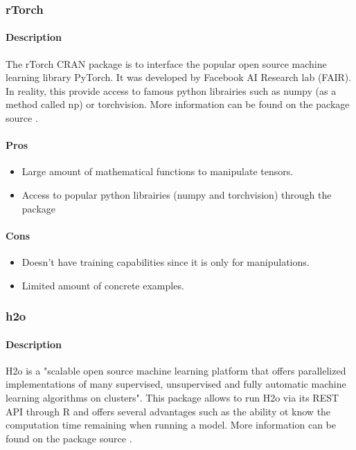 \documentclass[letter,8pt]{article}\usepackage[]{graphicx}\usepackage[]{color}
\begin{document}
\subsubsection{rTorch}
\paragraph{Description}
The rTorch CRAN package is to interface the popular open source machine learning library PyTorch. It was developed by Facebook AI Research lab (FAIR). In reality, this provide access to famous python librairies such as numpy (as a method called np) or torchvision. More information can be found on the package source \cite{rTorch2019}.
\paragraph{Pros}
\begin{itemize}
\item Large amount of mathematical functions to manipulate tensors.
\item Access to popular python librairies (numpy and torchvision) through the package
\end{itemize}
\paragraph{Cons}
\begin{itemize}
\item Doesn't have training capabilities since it is only for manipulations.
\item Limited amount of concrete examples.
\end{itemize}
\subsubsection{h2o}
\paragraph{Description}
H2o is a "scalable open source machine learning platform that offers parallelized implementations of many supervised, unsupervised and fully automatic machine learning algorithms on clusters". This package allows to run H2o via its REST API through R and offers several advantages such as the ability ot know the computation time remaining when running a model.
More information can be found on the package source \cite{h2o2020}.
\end{document}
